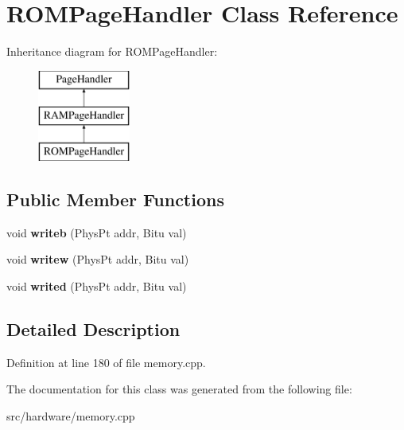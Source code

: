 \hypertarget{classROMPageHandler}{\section{R\-O\-M\-Page\-Handler Class Reference}
\label{classROMPageHandler}
}
Inheritance diagram for R\-O\-M\-Page\-Handler\-:\begin{figure}[H]
\begin{center}
\leavevmode
\includegraphics[height=3.000000cm]{classROMPageHandler}
\end{center}
\end{figure}
\subsection*{Public Member Functions}
\begin{DoxyCompactItemize}
\item 
\hypertarget{classROMPageHandler_aa90d31661b26c6a867783e3b8d299a43}{void {\bfseries writeb} (Phys\-Pt addr, Bitu val)}\label{classROMPageHandler_aa90d31661b26c6a867783e3b8d299a43}

\item 
\hypertarget{classROMPageHandler_a244bd425de97ffb60a1dbe3dfc513190}{void {\bfseries writew} (Phys\-Pt addr, Bitu val)}\label{classROMPageHandler_a244bd425de97ffb60a1dbe3dfc513190}

\item 
\hypertarget{classROMPageHandler_a47071afe3d028a424094077efe3356e5}{void {\bfseries writed} (Phys\-Pt addr, Bitu val)}\label{classROMPageHandler_a47071afe3d028a424094077efe3356e5}

\end{DoxyCompactItemize}


\subsection{Detailed Description}


Definition at line 180 of file memory.\-cpp.



The documentation for this class was generated from the following file\-:\begin{DoxyCompactItemize}
\item 
src/hardware/memory.\-cpp\end{DoxyCompactItemize}

